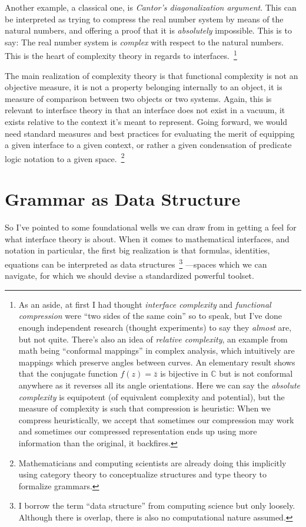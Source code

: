 \documentclass[twoside]{article}
\begin{document}
Another example, a classical one, is \emph{Cantor's diagonalization argument}. This can be interpreted as trying
to compress the real number system by means of the natural numbers, and offering a proof that it is \emph{absolutely}
impossible. This is to say: The real number system is \emph{complex} with respect to the natural numbers. This is the
heart of complexity theory in regards to interfaces.~\footnote{As an aside, at first I had thought \emph{interface complexity}
and \emph{functional compression} were ``two sides of the same coin'' so to speak, but I've done enough independent research
(thought experiments) to say they \emph{almost} are, but not quite. There's also an idea of \emph{relative complexity},
an example from math being ``conformal mappings'' in complex analysis, which intuitively are mappings which preserve
angles between curves.  An elementary result shows that the conjugate function $ f(z)=\bar{z} $ is bijective in $ \mathbb{C} $
but is not conformal anywhere as it reverses all its angle orientations. Here we can say the \emph{absolute complexity}
is equipotent (of equivalent complexity and potential), but the measure of complexity is such that compression
is heuristic: When we compress heuristically, we accept that sometimes our compression may work and sometimes
our compressed representation ends up using more information than the original, it backfires.}

The main realization of complexity theory is that functional complexity is not an objective measure, it is not a property
belonging internally to an object, it is measure of comparison between two objects or two systems. Again, this is relevant
to interface theory in that an interface does not exist in a vacuum, it exists relative to the context it's meant to represent.
Going forward, we would need standard measures and best practices for evaluating the merit of equipping a given interface
to a given context, or rather a given condensation of predicate logic notation to a given space.~\footnote{Mathematicians
and computing scientists are already doing this implicitly using category theory to conceptualize structures and type theory
to formalize grammars.}

\section*{Grammar as Data Structure} %

So I've pointed to some foundational wells we can draw from in getting a feel for what interface theory is about.
When it comes to mathematical interfaces, and notation in particular, the first big realization is that formulas,
identities, equations can be interpreted as data structures~\footnote{I borrow the term ``data structure'' from
computing science but only loosely. Although there is overlap, there is also no computational nature assumed.}
---spaces which we can navigate, for which we should devise a standardized powerful toolset.
\end{document}
